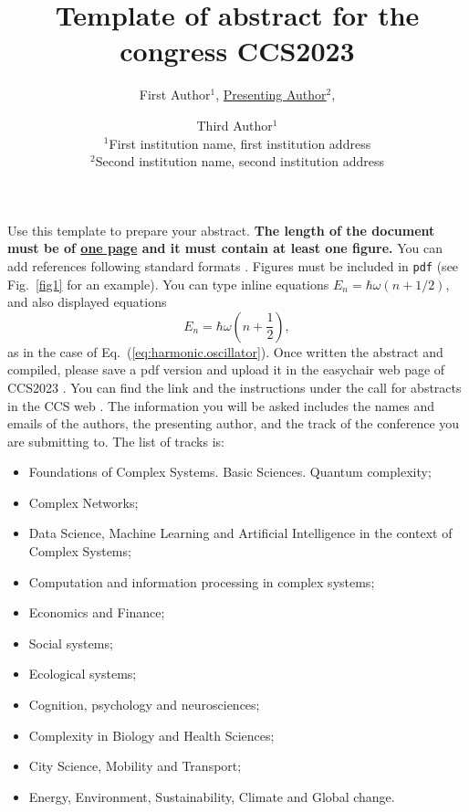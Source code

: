 \documentclass[a4paper]{article}
\begin{document}
\title{Template of abstract for the congress CCS2023}

\author{
First Author$^1$,
\underline{Presenting Author}$^2$,	%
\and
Third Author$^1$
\\
$^1$First institution name, first institution address
\\
$^2$Second institution name, second institution address
}
\maketitle


Use this template to prepare your abstract.
{\bf The length of the document must be of \underline{one page} and it must contain at least one figure.}  
You can add references following standard formats \cite{journal.cite,book.cite}.
Figures must be included in \texttt{pdf} (see Fig.~\ref{fig1} for an example).
You can type inline equations $E_n = \hbar\omega(n + 1/2)$, and also displayed equations
\begin{equation}
E_n = \hbar\omega\left( n + \frac{1}{2} \right),
\label{eq:harmonic.oscillator}
\end{equation}
as in the case of Eq.~(\ref{eq:harmonic.oscillator}).
Once written the abstract and compiled, please save a pdf version and upload it in the easychair web page of CCS2023 \cite{easy}. You can find the link and the instructions under the call for abstracts in the CCS web \cite{web}. The information you will be asked includes the names and emails of the authors, the presenting author, and the track of the conference you are submitting to. The list of tracks is:
\begin{itemize}
\setlength\itemsep{-0.4em}
\item Foundations of Complex Systems. Basic Sciences. Quantum complexity;
\item Complex Networks;
\item Data Science, Machine Learning and Artificial Intelligence in the context of Complex Systems;
\item Computation and information processing in complex systems;
\item Economics and Finance;
\item Social systems;
\item Ecological systems;
\item Cognition, psychology and neurosciences;
\item Complexity in Biology and Health Sciences;
\item City Science, Mobility and Transport;
\item Energy, Environment, Sustainability, Climate and Global change.
\end{itemize} 
\end{document}
